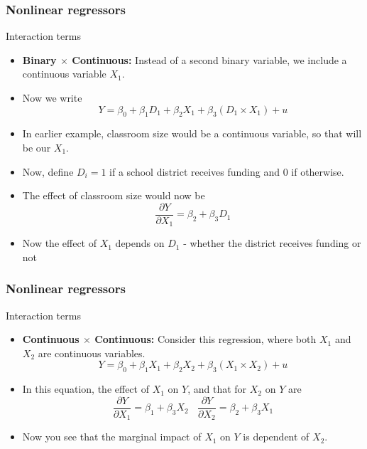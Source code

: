 \documentclass[compress]{beamer}
\begin{document}
\begin{frame}
\frametitle{Nonlinear regressors}
Interaction terms
\begin{itemize}
\item \textbf{Binary $\times$ Continuous: } Instead of a second binary variable, we include a continuous variable $X_1$. 
\item Now we write
\[
Y= \beta_0 + \beta_1 D_1 + \beta_2 X_1 + \beta_3 (D_1 \times X_1) + u
\]
\item In earlier example, classroom size would be a continuous variable, so that will be our $X_1$. 
\item Now, define $D_i=1$ if a school district receives funding and $0$ if otherwise. 
\item The effect of classroom size would now be 
\[
\frac{\partial Y}{\partial X_1} = \beta_2 + \beta_3 D_1
\]
\item Now the effect of $X_1$ depends on $D_1$ - whether the district receives funding or not
\end{itemize}
\end{frame}

\begin{frame}
\frametitle{Nonlinear regressors}
Interaction terms
\begin{itemize}
\item \textbf{Continuous $\times$ Continuous: } Consider this regression, where both $X_1$ and $X_2$ are continuous variables. 
\[
Y = \beta_0 + \beta_1X_1 + \beta_2 X_2 + \beta_3 (X_1\times X_2)+u
\] 
\item In this equation, the effect of $X_1$ on $Y$, and that for $X_2$ on $Y$ are
\[
\frac{\partial Y}{\partial X_1} = \beta_1 + \beta_3 X_2 \ \ \ \ \frac{\partial Y}{\partial X_2} = \beta_2 + \beta_3 X_1 
\]
\item Now you see that the marginal impact of $X_1$ on $Y$ is dependent of $X_2$. 
\end{itemize}
\end{frame}
\end{document}
